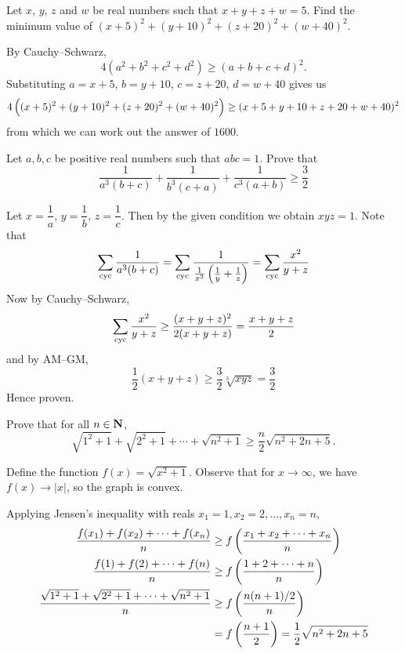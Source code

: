\begin{prbm}
Let $x$, $y$, $z$ and $w$ be real numbers such that $x+y+z+w=5$. Find the minimum value of $(x+5)^2+(y+10)^2+(z+20)^2+(w+40)^2$. 
\end{prbm}

\begin{solution}
By Cauchy--Schwarz,
\[ 4(a^2+b^2+c^2+d^2)\ge(a+b+c+d)^2. \]
Substituting $a=x+5$, $b=y+10$, $c=z+20$, $d=w+40$ gives us
\[ 4\left((x+5)^2+(y+10)^2+(z+20)^2+(w+40)^2\right)\ge(x+5+y+10+z+20+w+40)^2 \]
from which we can work out the answer of $\boxed{1600}$.
\end{solution}
\pagebreak

\begin{prbm}
Let $a, b, c$ be positive real numbers such that $abc=1$. Prove that
\[ \frac{1}{a^3(b+c)}+\frac{1}{b^3(c+a)}+\frac{1}{c^3(a+b)} \ge \frac{3}{2} \]
\end{prbm}

\begin{solution}
Let $x=\dfrac{1}{a}$, $y=\dfrac{1}{b}$, $z=\dfrac{1}{c}$. Then by the given condition we obtain $xyz=1$. Note that
\[ \sum_{\mathrm{cyc}}\frac{1}{a^3(b+c)}=\sum_{\mathrm{cyc}}\frac{1}{\frac{1}{x^3}\left(\frac{1}{y}+\frac{1}{z}\right)}=\sum_{\mathrm{cyc}}\frac{x^2}{y+z} \]
Now by Cauchy--Schwarz,
\[ \sum_{\mathrm{cyc}}\frac{x^2}{y+z}\ge\frac{(x+y+z)^2}{2(x+y+z)}=\frac{x+y+z}{2} \]
and by AM--GM,
\[ \frac{1}{2}(x+y+z)\ge\frac{3}{2}\sqrt[3]{xyz}=\frac{3}{2} \]
Hence proven.
\end{solution}
\pagebreak

\begin{prbm}
Prove that for all $n \in \mathbf N$,
\[ \sqrt{1^2+1}+\sqrt{2^2+1}+\cdots+\sqrt{n^2+1}\ge\frac{n}{2}\sqrt{n^2+2n+5}. \]
\end{prbm}

\begin{solution}
Define the function $f(x)=\sqrt{x^2+1}$. Observe that for $x\to\infty$, we have $f(x)\to|x|$, so the graph is convex.

Applying Jensen's inequality with reals $x_1=1,x_2=2,\dots,x_n=n$,
\begin{align*}
\frac{f(x_1)+f(x_2)+\cdots+f(x_n)}{n} &\ge f\left(\frac{x_1+x_2+\cdots+x_n}{n}\right) \\
\frac{f(1)+f(2)+\cdots+f(n)}{n} &\ge f\left(\frac{1+2+\cdots+n}{n}\right) \\
\frac{\sqrt{1^2+1}+\sqrt{2^2+1}+\cdots+\sqrt{n^2+1}}{n} &\ge f\left(\frac{n(n+1)/2}{n}\right)\\&= f\left(\frac{n+1}{2}\right)=\frac{1}{2}\sqrt{n^2+2n+5}
\end{align*}
\end{solution}
\pagebreak

